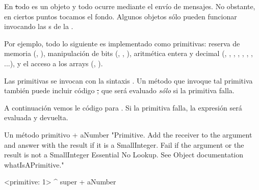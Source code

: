 \documentclass[a4paper,10pt,twoside]{book}
\begin{document}
En \st todo es un objeto y todo ocurre mediante el env\'io de mensajes.
No obstante, en ciertos puntos tocamos el fondo.
Algunos objetos s\'olo pueden funcionar invocando las s de la .

Por ejemplo, todo lo siguiente es implementado como primitivas:
reserva de memoria (, ),
manipulaci\'on de bits (, , ),
aritm\'etica entera y decimal (\ct{+}, \ct{-},  \ct{<},  \ct{>}, \ct{*}, \ct{/ }, \ct{=}, \ct{==}...),
y el acceso a los arrays (, ).

Las primitivas se invocan con la sintaxis .
Un m\'etodo que invoque tal primitiva tambi\'en puede incluir c\'odigo \st, que ser\'a evaluado \emph{s\'olo} si la primitiva falla.

A continuaci\'on vemos le c\'odigo para .
Si la primitiva falla, la expresi\'on  ser\'a evaluada y devuelta.

\begin{method}[primitive]{Un m\'etodo primitivo}
+ aNumber 
  "Primitive. Add the receiver to the argument and answer with the result
  if it is a SmallInteger. Fail if the argument or the result is not a
  SmallInteger  Essential  No Lookup. See Object documentation whatIsAPrimitive."

  <primitive: 1>
  ^ super + aNumber
\end{method}



\end{document}
